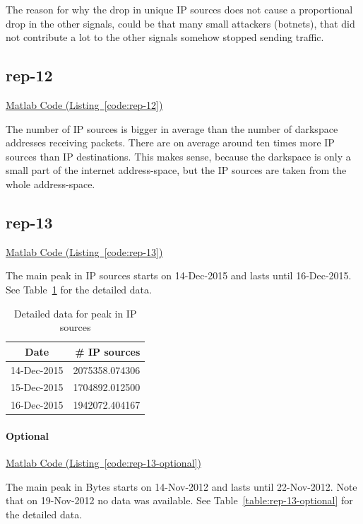 \documentclass{article}
\newcommand{\codelink}[1]{%
    \hyperref[#1]{\faArrowCircleRight\enskip Matlab Code (Listing~\ref{#1})}%
}
\begin{document}
The reason for why the drop in unique IP sources does not cause a proportional drop in the other
signals, could be that many small attackers (botnets), that did not contribute a lot to the other
signals somehow stopped sending traffic.

\subsection{rep-12}

\codelink{code:rep-12}

The number of IP sources is bigger in average than the number of darkspace addresses
receiving packets. There are on average around ten times more IP sources than IP destinations.
This makes sense, because the darkspace is only a small part of the internet address-space, but
the IP sources are taken from the whole address-space.

\subsection{rep-13}
\codelink{code:rep-13}

The main peak in IP sources starts on 14-Dec-2015 and lasts until 16-Dec-2015. See Table~\ref{table:rep-13}
for the detailed data.

\begin{table}[h]
    \centering
    \begin{tabular}{c|r}
        Date & \# IP sources \\
        \hline
        14-Dec-2015 & 2075358.074306 \\
        15-Dec-2015 & 1704892.012500 \\
        16-Dec-2015 & 1942072.404167 \\
    \end{tabular}
    \caption{\label{table:rep-13} Detailed data for peak in IP sources}
\end{table}

\paragraph{Optional}
\codelink{code:rep-13-optional}
The main peak in Bytes starts on 14-Nov-2012 and lasts until 22-Nov-2012. Note that
on 19-Nov-2012 no data was available. See Table~\ref{table:rep-13-optional}
for the detailed data.
\end{document}
